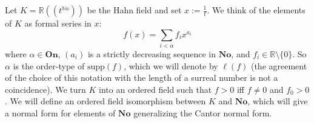 
Let $K=\mathbb{R}((t^\mathbb{No}))$ be the Hahn field and set $x:=\frac{1}{t}$. We think of the elements of $K$ as formal series in $x$:
$$f(x)=\sum_{i<\alpha}f_ix^{a_i}$$
where $\alpha\in \mathbf{On}$, $(a_i)$ is a strictly decreasing sequence in $\mathbf{No}$, and $f_i\in \mathbb{R}\setminus \{0\}$. So $\alpha$ is the order-type of $\mathrm{supp}(f)$, which we will denote by $\ell(f)$ (the agreement of the choice of this notation with the length of a surreal number is not a coincidence). We turn $K$ into an ordered field such that $f>0$ iff $f\neq 0$ and $f_0>0$. We will define an ordered field isomorphism between $K$ and $\mathbf{No}$, which will give a normal form for elements of $\mathbf{No}$ generalizing the Cantor normal form.
